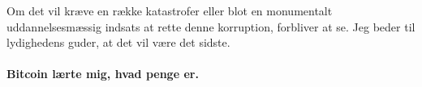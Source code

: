 Om det vil kræve en række katastrofer eller blot en monumentalt uddannelsesmæssig indsats at rette denne korruption, forbliver at se. Jeg beder til lydighedens guder, at det vil være det sidste.

\paragraph{Bitcoin lærte mig, hvad penge er.}

%
%
%
%
